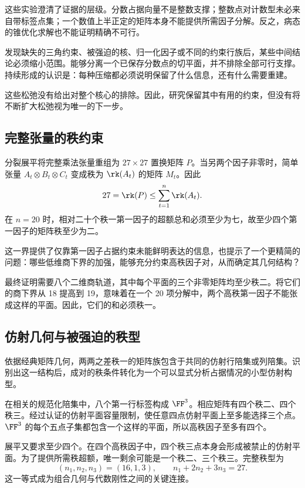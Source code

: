 这些实验澄清了证据的层级。分数占据向量不是整数支撑；整数点对计数型未必来自带标签点集；一个数值上半正定的矩阵本身不能提供所需因子分解。反之，病态的锥优化求解也不能证明精确不可行。

发现缺失的三角约束、被强迫的核、归一化因子或不同的约束行族后，某些中间结论必须缩小范围。能够分离一个已保存分数点的切平面，并不排除全部可行支撑。持续形成的认识是：每种压缩都必须说明保留了什么信息，还有什么需要重建。

这些松弛没有给出对整个核心的排除。因此，研究保留其中有用的约束，但没有将不断扩大松弛视为唯一的下一步。

\subsection{完整张量的秩约束}\label{route:full}

分裂展平将完整乘法张量重组为 $27\times27$ 置换矩阵 $P$。当另两个因子非零时，简单张量 $A_t\otimes B_t\otimes C_t$ 变成秩为 $\rk(A_t)$ 的矩阵 $M_t$。因此
\[
 27=\rk(P)\le\sum_{t=1}^{n}\rk(A_t).
\]
在 $n=20$ 时，相对二十个秩一第一因子的超额总和必须至少为七，故至少四个第一因子的矩阵秩至少为二。

这一界提供了仅靠第一因子占据约束未能鲜明表达的信息，也提示了一个更精简的问题：哪些低维商下界的加强，能够充分约束高秩因子对，从而确定其几何结构？

最终证明需要八个二维商轨道，其中每个平面的三个非零矩阵均至少秩二。将它们的商下界从 18 提高到 19，意味着在一个 20 项分解中，两个高秩第一因子不能张成这样的平面。因此，它们的和必须秩一。

\subsection{仿射几何与被强迫的秩型}\label{route:geometry}

依据经典矩阵几何\cite{hua1945geometries,wan1996geometry}，两两之差秩一的矩阵族包含于共同的仿射行陪集或列陪集。识别出这一结构后，成对的秩条件转化为一个可以显式分析占据情况的小型仿射构型。

在相关的规范化陪集中，八个第一行标签构成 $\FF^3$。相应矩阵有四个秩二、四个秩三。经过认证的仿射平面容量限制，使任意四点仿射平面上至多能选择三个点。$\FF^3$ 的每个五点子集都包含一个这样的平面，所以高秩因子至多有四个。

展平又要求至少四个。在四个高秩因子中，四个秩三点本身会形成被禁止的仿射平面。为了提供所需秩超额，唯一剩余可能是一个秩二、三个秩三。完整秩型为
\[
 (n_1,n_2,n_3)=(16,1,3),\qquad
 n_1+2n_2+3n_3=27.
\]
这一等式成为组合几何与代数刚性之间的关键连接。

